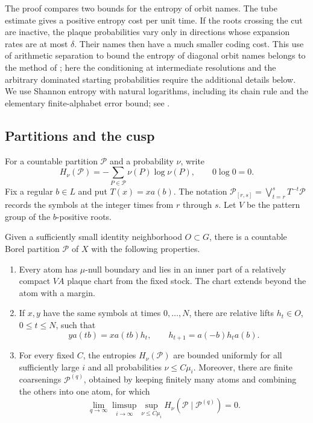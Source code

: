 The proof compares two bounds for the entropy of orbit names.  The tube
estimate gives a positive entropy cost per unit time.  If the roots crossing
the cut are inactive, the plaque probabilities vary only in directions
whose expansion rates are at most $\delta$.  Their names then have a much
smaller coding cost.  This use of arithmetic separation to bound the entropy
of diagonal orbit names belongs to the method of
\cite{ELMV2009}; here the conditioning at intermediate resolutions and the
arbitrary dominated starting probabilities require the additional details
below.  We use Shannon entropy with natural logarithms, including its chain
rule and the elementary finite-alphabet error bound; see
\cite[Chapter~2]{CoverThomas2006}.

\subsection{Partitions and the cusp}

For a countable partition $\mathcal P$ and a probability $\nu$, write
\[
 H_\nu(\mathcal P)=-\sum_{P\in\mathcal P}\nu(P)\log\nu(P),
 \qquad 0\log0=0.
\]
Fix a regular $b\in L$ and put $T(x)=xa(b)$.  The notation
$\mathcal P_{[r,s]}=\bigvee_{t=r}^sT^{-t}\mathcal P$ records the symbols at
the integer times from $r$ through $s$.  Let $V$ be the pattern group of
the $b$-positive roots.

\begin{lemma}\label{lem:entropy-partition}
Given a sufficiently small identity neighborhood $O\subset G$, there is a
countable Borel partition $\mathcal P$ of $X$ with the following properties.
\begin{enumerate}
 \item Every atom has $\mu$-null boundary and lies in an inner part of a
 relatively compact $VA$ plaque chart from the fixed stock.  The chart
 extends beyond the atom with a margin.
 \item If $x,y$ have the same symbols at times $0,\ldots,N$, there are
 relative lifts $h_t\in O$, $0\leq t\leq N$, such that
 \[
  ya(tb)=xa(tb)h_t,
  \qquad h_{t+1}=a(-b)h_ta(b).
 \]
 \item For every fixed $C$, the entropies $H_\nu(\mathcal P)$ are bounded
 uniformly for all sufficiently large $i$ and all probabilities
 $\nu\leq C\mu_i$.  Moreover, there are finite coarsenings
 $\mathcal P^{(q)}$, obtained by keeping finitely many atoms and combining
 the others into one atom, for which
 \begin{equation}\label{eq:partition-entropy-tails}
  \lim_{q\to\infty}\limsup_{i\to\infty}
  \sup_{\nu\leq C\mu_i}
  H_\nu(\mathcal P\mid\mathcal P^{(q)})=0.
 \end{equation}
\end{enumerate}
\end{lemma}

